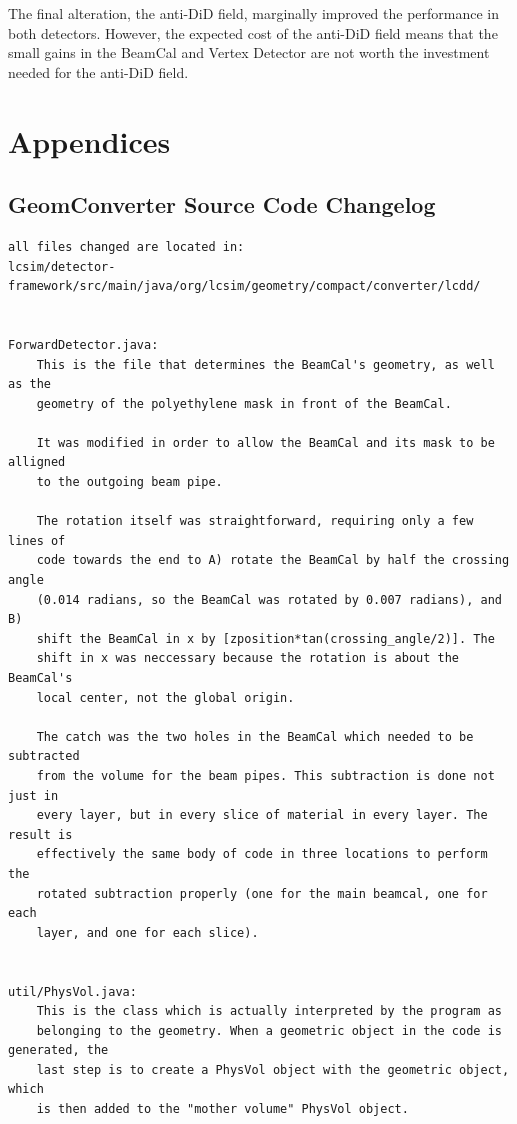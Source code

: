 \documentclass{report}
\begin{document}
            The final alteration, the anti-DiD field, marginally improved the performance in both detectors. However, the expected cost of the anti-DiD field means that the small gains in the BeamCal and Vertex Detector are not worth the investment needed for the anti-DiD field.





    \chapter{Appendices}
        \section{GeomConverter Source Code Changelog} \label{sect__geom_changes}
            \begin{verbatim}
all files changed are located in:
lcsim/detector-framework/src/main/java/org/lcsim/geometry/compact/converter/lcdd/


ForwardDetector.java:
    This is the file that determines the BeamCal's geometry, as well as the
    geometry of the polyethylene mask in front of the BeamCal.
    
    It was modified in order to allow the BeamCal and its mask to be alligned
    to the outgoing beam pipe.
    
    The rotation itself was straightforward, requiring only a few lines of
    code towards the end to A) rotate the BeamCal by half the crossing angle
    (0.014 radians, so the BeamCal was rotated by 0.007 radians), and B) 
    shift the BeamCal in x by [zposition*tan(crossing_angle/2)]. The
    shift in x was neccessary because the rotation is about the BeamCal's
    local center, not the global origin. 

    The catch was the two holes in the BeamCal which needed to be subtracted
    from the volume for the beam pipes. This subtraction is done not just in
    every layer, but in every slice of material in every layer. The result is
    effectively the same body of code in three locations to perform the
    rotated subtraction properly (one for the main beamcal, one for each
    layer, and one for each slice). 


util/PhysVol.java:
    This is the class which is actually interpreted by the program as
    belonging to the geometry. When a geometric object in the code is generated, the
    last step is to create a PhysVol object with the geometric object, which
    is then added to the "mother volume" PhysVol object.


\end{verbatim}
\end{document}
